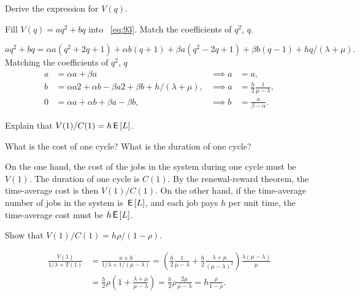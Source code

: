 \begin{exercise}\label{ex:nmm-2}
Derive the expression for $V(q)$.
\begin{hint}
  Fill $V(q) = aq^2 + bq$ into ~\cref{eq:93}. Match the coefficients of $q^2$, $q$.
\end{hint}
\begin{solution}
  \begin{equation*}
    aq^2 + b q = \alpha a (q^2 + 2q + 1) + \alpha b (q+1) + \beta a (q^2 - 2q + 1) + \beta b (q - 1) + hq/(\lambda + \mu). 
  \end{equation*}
  Matching the coefficients of $q^2$, $q$ 
  \begin{align*}
    a &= \alpha a + \beta a &\implies a &= a, \\
    b &= \alpha a 2 + \alpha b - \beta a 2 + \beta b + h/(\lambda + \mu), & \implies a &= \frac h 2 \frac 1 {\mu -\lambda},\\
    0 &= \alpha a + \alpha b + \beta a - \beta b, & \implies b &= \frac a {\beta - \alpha}. 
  \end{align*}
\end{solution}
\end{exercise}

\begin{exercise}\label{ex:nmm5}
Explain that $V(1)/C(1) = h \,\mathsf{E}\left[L\right]$. 
\begin{hint}
  What is the cost of one cycle? What is the duration of one cycle? 
\end{hint}
\begin{solution}
  On the one hand, the cost of the jobs in the system during one cycle must be $V(1)$.
  The duration of one cycle is $C(1)$.
  By the renewal-reward theorem, the time-average cost is then $V(1)/C(1)$.
  On the other hand, if the time-average number of jobs in the system is $\,\mathsf{E}\left[L\right]$, and each job pays $h$ per unit time, the time-average cost must be $h \,\mathsf{E}\left[L\right]$.
\end{solution}
\end{exercise}

\begin{exercise}\label{ex:62}
Show that $V(1)/C(1) = h \rho/(1-\rho).$
\begin{solution}
\begin{align*}
  \frac{V(1)}{1/\lambda + T(1)}
  &= \frac{a+b}{1/\lambda + 1/(\mu-\lambda)} 
= \left(\frac h 2 \frac 1 {\mu -\lambda} + \frac h 2 \frac{\lambda + \mu}{(\mu - \lambda)^2}\right)\frac{\lambda(\mu-\lambda)}{\mu}\\
&=\frac{h}2 \rho \left(1 + \frac{\lambda+\mu}{\mu-\lambda}\right) = \frac{h}{2} \rho \frac{2\mu}{\mu-\lambda}  = h \frac{\rho}{1-\rho}.
\end{align*}
\end{solution}
\end{exercise}


